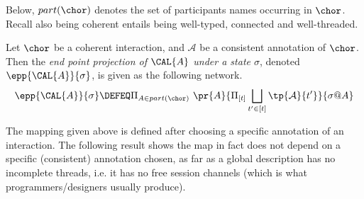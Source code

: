Below, 
$part(\chor)$ denotes the set of participants names occurring in
$\chor$. Recall also being coherent entails being well-typed,
connected and well-threaded.


\begin{definition}
\label{Logic4Struct:def:epp}
Let $\chor$ be a coherent interaction, and %
 $\mathcal A$ be a
consistent annotation of $\chor$.  
Then the {\em end point projection of
  $\CAL{A}$ under a state $\sigma$}, denoted $\epp{\CAL{A}}{\sigma}$, is given as the following network.
\[
\epp{\CAL{A}}{\sigma} \DEFEQ
\Pi_{A \in part(\chor)}\ 
\pr
{A}
{\Pi_{[t]}\bigsqcup_{t'\in[t]}\tp{\mathcal A}{t'}}
{\sigma@A}
\]
\end{definition} 

The mapping given above is defined after choosing a specific
annotation of an interaction. The following result shows the map in
fact does not depend on a specific (consistent) annotation chosen, as
far as a global description has no incomplete threads, i.e. it has no
free session channels (which is what programmers/designers usually
produce).

